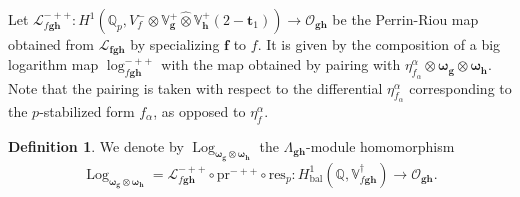 \documentclass[a4paper,11pt]{amsart}
\theoremstyle{plain}
\theoremstyle{definition}
\newtheorem{defi}[theorem]{Definition}
\theoremstyle{remark}
\newcommand{\bb}{\mathbb}
\newcommand{\cl}{\mathcal}
\DeclareMathOperator{\BF}{BF}
\DeclareMathOperator{\bal}{bal}
\DeclareMathOperator{\Log}{Log}
\newcommand{\hf}{{\mathbf{f}}}
\newcommand{\hg}{{\mathbf{g}}}
\newcommand{\hh}{{\mathbf h}}
\newcommand{\res}{\mathrm{res}}
\numberwithin{equation}{section}
\begin{document}
Let $\cl{L}_{f\hg\hh}^{-++}:H^1(\bb{Q}_p,V_f^-\otimes \bb{V}_{\hg}^+\hat{\otimes}\bb{V}_{\hh}^+(2-\mathbf{t}_1))\rightarrow \cl{O}_{\hg\hh}$ be the Perrin-Riou map obtained from $\cl{L}_{\hf\hg\hh}$ by specializing $\hf$ to $f$. It is given by the composition of a big logarithm map $\log_{f \hg \hh}^{-++}$ with the map obtained by pairing with $\eta_{f_\alpha}^\alpha\otimes \bm{\omega}_{\hg}\otimes \bm{\omega}_{\hh}$. Note that the pairing is taken with respect to the differential $\eta_{f_\alpha}^\alpha$ corresponding to the $p$-stabilized form $f_\alpha$, as opposed to $\eta_f^\alpha$.

\begin{defi}\label{def:big-log}
We denote by $\Log_{\bm{\omega}_{\hg} \otimes \bm{\omega}_{\hh}}$ the $\Lambda_{\hg\hh}$-module homomorphism
\[
\Log_{\bm{\omega}_{\hg} \otimes \bm{\omega}_{\hh}}=\cl{L}^{-++}_{f\hg\hh}\circ\mathrm{pr}^{-++}\circ\res_p : H^1_{\bal}(\bb{Q},\bb{V}_{f\hg\hh}^\dagger)\longrightarrow  \cl{O}_{\hg\hh}.
\]

\end{defi}
\end{document}
